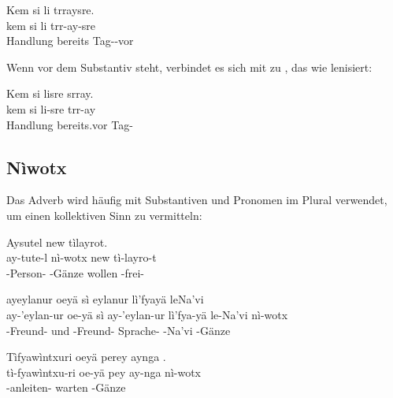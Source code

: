 \begin{interlin}
	\glll \Npawl{}Kem si li trraysre. \\
	kem si li trr-ay-sre \\
	Handlung  bereits Tag--vor \\
\end{interlin}

\noindent Wenn  vor dem Substantiv steht, verbindet es sich mit  zu , das wie  lenisiert:

\begin{interlin}
	\glll \Npawl{}Kem si lisre srray. \\
	kem si li-sre trr-ay \\
	Handlung  bereits.vor Tag- \\
\end{interlin}

\subsection{Nìwotx} Das Adverb   wird häufig mit Substantiven und Pronomen im Plural verwendet, um einen kollektiven Sinn zu vermitteln:

\begin{interlin}
	\glll \Npawl{}Aysutel  new tìlayrot. \\
	ay-tute-l nì-wotx new tì-layro-t \\
	-Person- -Gänze wollen -frei- \\
\end{interlin}

\begin{interlin}
	\glll \Npawl{}ayeylanur oeyä sì eylanur lì'fyayä leNa'vi  \\
	ay-'eylan-ur oe-yä sì ay-'eylan-ur lì'fya-yä le-Na'vi nì-wotx \\
	-Freund-  und -Freund- Sprache- -Na'vi -Gänze \\
\end{interlin}

\begin{interlin}
	\glll \Npawl{}Tìfyawìntxuri oeyä perey aynga . \\
	tì-fyawìntxu-ri oe-yä pey ay-nga nì-wotx \\
	-anleiten-  warten  -Gänze \\
\end{interlin}

